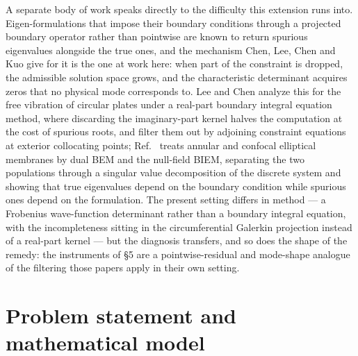 \documentclass[11pt]{article}
\begin{document}
A separate body of work speaks directly to the difficulty this extension
runs into. Eigen-formulations that impose their boundary conditions through
a projected boundary operator rather than pointwise are known to return
spurious eigenvalues alongside the true ones, and the mechanism Chen, Lee,
Chen and Kuo \cite{chen2013} give for it is the one at work here: when part
of the constraint is dropped, the admissible solution space grows, and the
characteristic determinant acquires zeros that no physical mode
corresponds to. Lee and Chen \cite{leechen2008} analyze this for the free
vibration of circular plates under a real-part boundary integral equation
method, where discarding the imaginary-part kernel halves the computation
at the cost of spurious roots, and filter them out by adjoining constraint
equations at exterior collocating points; Ref.~\cite{chen2013} treats
annular and confocal elliptical membranes by dual BEM and the null-field
BIEM, separating the two populations through a singular value
decomposition of the discrete system and showing that true eigenvalues
depend on the boundary condition while spurious ones depend on the
formulation. The present setting differs in method --- a Frobenius
wave-function determinant rather than a boundary integral equation, with the incompleteness sitting in the circumferential Galerkin projection instead of a real-part kernel --- but the diagnosis transfers, and so does the
shape of the remedy: the instruments of \S5 are a pointwise-residual and
mode-shape analogue of the filtering those papers apply in their own
setting.

\section{Problem statement and mathematical model}
\end{document}
